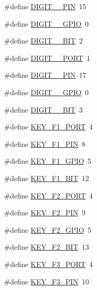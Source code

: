 \begin{DoxyCompactItemize}
\item 
\#define \hyperlink{group__hal_gadd43f59c719841c9b909b1ac0d560306}{D\+I\+G\+I\+T\+\_\+\_\+\+P\+IN}~15
\item 
\#define \hyperlink{group__hal_gaaf8008c853f00449d861006e24ed25d3}{D\+I\+G\+I\+T\+\_\+\_\+\+G\+P\+IO}~0
\item 
\#define \hyperlink{group__hal_gaf2ebdb0e4e98558a4daa6f8f12e60508}{D\+I\+G\+I\+T\+\_\+\_\+\+B\+IT}~2
\item 
\#define \hyperlink{group__hal_gab7d700449bc667114f470a18eafc1df0}{D\+I\+G\+I\+T\+\_\+\_\+\+P\+O\+RT}~1
\item 
\#define \hyperlink{group__hal_ga73ea133d9e15b39a48d0b9ed29fb9aac}{D\+I\+G\+I\+T\+\_\+\_\+\+P\+IN}~17
\item 
\#define \hyperlink{group__hal_ga220245662e59f4aa122cbcf8e19ec0ba}{D\+I\+G\+I\+T\+\_\+\_\+\+G\+P\+IO}~0
\item 
\#define \hyperlink{group__hal_ga92ba98d9cb75844689edbad1e7fa38ed}{D\+I\+G\+I\+T\+\_\+\_\+\+B\+IT}~3
\item 
\#define \hyperlink{group__hal_ga72e1794db5f08d265794fd5895a0abda}{K\+E\+Y\+\_\+\+F1\+\_\+\+P\+O\+RT}~4
\item 
\#define \hyperlink{group__hal_gabd127e01a2241701fa51b22a5e1ac2d2}{K\+E\+Y\+\_\+\+F1\+\_\+\+P\+IN}~8
\item 
\#define \hyperlink{group__hal_ga5ca4d37214720b82e845407c6fa2347a}{K\+E\+Y\+\_\+\+F1\+\_\+\+G\+P\+IO}~5
\item 
\#define \hyperlink{group__hal_gaa5e208d84a752a40a307c23236dc60e2}{K\+E\+Y\+\_\+\+F1\+\_\+\+B\+IT}~12
\item 
\#define \hyperlink{group__hal_gaed0ee447835028acfe743784357d77e8}{K\+E\+Y\+\_\+\+F2\+\_\+\+P\+O\+RT}~4
\item 
\#define \hyperlink{group__hal_ga7016f3ff674089b3e9377b58fd5791a2}{K\+E\+Y\+\_\+\+F2\+\_\+\+P\+IN}~9
\item 
\#define \hyperlink{group__hal_ga84995a20a536edfbc062b220c761768e}{K\+E\+Y\+\_\+\+F2\+\_\+\+G\+P\+IO}~5
\item 
\#define \hyperlink{group__hal_gaa1529bc5c7a8cc9c0221078f2425eed8}{K\+E\+Y\+\_\+\+F2\+\_\+\+B\+IT}~13
\item 
\#define \hyperlink{group__hal_ga411346b5b630b61fd785409608439be4}{K\+E\+Y\+\_\+\+F3\+\_\+\+P\+O\+RT}~4
\item 
\#define \hyperlink{group__hal_ga98312a957dc7b3acccc0fe34a7604e56}{K\+E\+Y\+\_\+\+F3\+\_\+\+P\+IN}~10
\item 

\end{DoxyCompactItemize}
